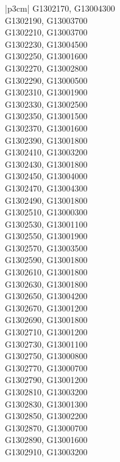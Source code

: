 \begin{customLongTable}{ |p{3cm}| }
G1302170, G13004300 \\ \hline
G1302190, G13003700 \\ \hline
G1302210, G13003700 \\ \hline
G1302230, G13004500 \\ \hline
G1302250, G13001600 \\ \hline
G1302270, G13002800 \\ \hline
G1302290, G13000500 \\ \hline
G1302310, G13001900 \\ \hline
G1302330, G13002500 \\ \hline
G1302350, G13001500 \\ \hline
G1302370, G13001600 \\ \hline
G1302390, G13001800 \\ \hline
G1302410, G13003200 \\ \hline
G1302430, G13001800 \\ \hline
G1302450, G13004000 \\ \hline
G1302470, G13004300 \\ \hline
G1302490, G13001800 \\ \hline
G1302510, G13000300 \\ \hline
G1302530, G13001100 \\ \hline
G1302550, G13001900 \\ \hline
G1302570, G13003500 \\ \hline
G1302590, G13001800 \\ \hline
G1302610, G13001800 \\ \hline
G1302630, G13001800 \\ \hline
G1302650, G13004200 \\ \hline
G1302670, G13001200 \\ \hline
G1302690, G13001800 \\ \hline
G1302710, G13001200 \\ \hline
G1302730, G13001100 \\ \hline
G1302750, G13000800 \\ \hline
G1302770, G13000700 \\ \hline
G1302790, G13001200 \\ \hline
G1302810, G13003200 \\ \hline
G1302830, G13001300 \\ \hline
G1302850, G13002200 \\ \hline
G1302870, G13000700 \\ \hline
G1302890, G13001600 \\ \hline
G1302910, G13003200 \\ \hline

\end{customLongTable}
